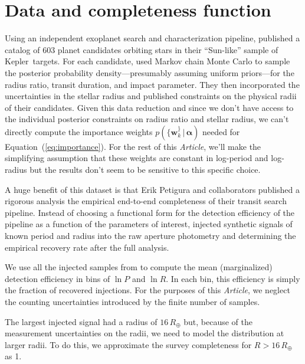 \documentclass[12pt,preprint]{aastex}
\newcommand{\project}[1]{{\sffamily #1}}
\newcommand{\kepler}{\project{Kepler}}
\newcommand{\paper}{\textsl{Article}}
\newcommand{\Eq}[1]{Equation~(\ref{eq:#1})}
\newcommand{\eq}[1]{\Eq{#1}}
\newcommand{\bvec}[1]{\ensuremath{\boldsymbol{#1}}}
\newcommand{\radius}{\ensuremath{R}}
\newcommand{\period}{\ensuremath{P}}
\newcommand{\entry}{{\ensuremath{\bvec{w}}}}
\newcommand{\interim}{{\ensuremath{\bvec{\alpha}}}}
\begin{document}
\section{Data and completeness function}

Using an independent exoplanet search and characterization pipeline,
\citet{petigura} published a catalog of 603 planet candidates orbiting stars
in their ``Sun-like'' sample of \kepler\ targets.
For each candidate, \citet{petigura} used Markov chain Monte Carlo to sample
the posterior probability density---presumably assuming uniform priors---for
the radius ratio, transit duration, and impact parameter.
They then incorporated the uncertainties in the stellar radius and published
constraints on the physical radii of their candidates.
Given this data reduction and since we don't have access to the individual
posterior constraints on radius ratio and stellar radius, we can't directly
compute the importance weights $p(\{\entry_k^\}\,|\,\interim)$ needed for
\eq{importance}.
For the rest of this \paper, we'll make the simplifying assumption that these
weights are constant in log-period and log-radius but the results don't seem
to be sensitive to this specific choice.

A huge benefit of this dataset is that Erik Petigura and collaborators
published a rigorous analysis the empirical end-to-end completeness of their
transit search pipeline.
Instead of choosing a functional form for the detection efficiency of the
pipeline as a function of the parameters of interest, \citet{petigura}
injected synthetic signals of known period and radius into the raw aperture
photometry and determining the empirical recovery rate after the full analysis.

We use all the injected samples from \citet{petigura} to compute the mean
(marginalized) detection efficiency in bins of $\ln\period$ and $\ln\radius$.
In each bin, this efficiency is simply the fraction of recovered injections.
For the purposes of this \paper, we neglect the counting uncertainties
introduced by the finite number of samples.

The largest injected signal had a radius of $16\,R_\oplus$ but, because of the
measurement uncertainties on the radii, we need to model the distribution at
larger radii.
To do this, we approximate the survey completeness for $\radius>16\,R_\oplus$
as 1.
\end{document}
